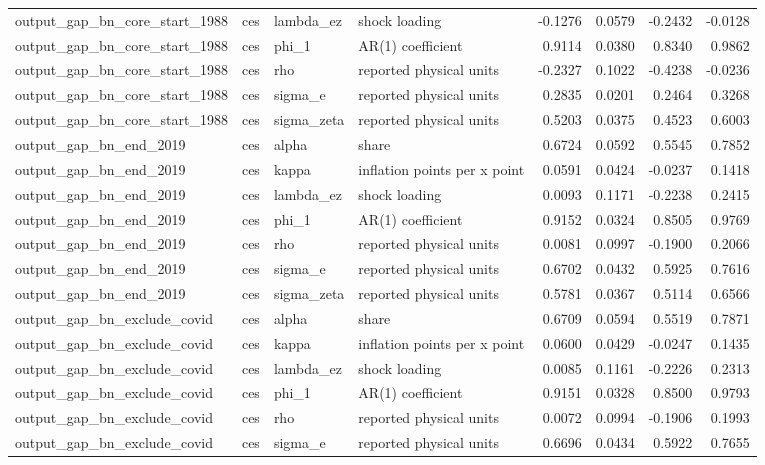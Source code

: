 \begin{tabular}{llllrrrr}
output\_gap\_bn\_core\_start\_1988 & ces & lambda\_ez & shock loading & -0.1276 & 0.0579 & -0.2432 & -0.0128 \\
output\_gap\_bn\_core\_start\_1988 & ces & phi\_1 & AR(1) coefficient & 0.9114 & 0.0380 & 0.8340 & 0.9862 \\
output\_gap\_bn\_core\_start\_1988 & ces & rho & reported physical units & -0.2327 & 0.1022 & -0.4238 & -0.0236 \\
output\_gap\_bn\_core\_start\_1988 & ces & sigma\_e & reported physical units & 0.2835 & 0.0201 & 0.2464 & 0.3268 \\
output\_gap\_bn\_core\_start\_1988 & ces & sigma\_zeta & reported physical units & 0.5203 & 0.0375 & 0.4523 & 0.6003 \\
output\_gap\_bn\_end\_2019 & ces & alpha & share & 0.6724 & 0.0592 & 0.5545 & 0.7852 \\
output\_gap\_bn\_end\_2019 & ces & kappa & inflation points per x point & 0.0591 & 0.0424 & -0.0237 & 0.1418 \\
output\_gap\_bn\_end\_2019 & ces & lambda\_ez & shock loading & 0.0093 & 0.1171 & -0.2238 & 0.2415 \\
output\_gap\_bn\_end\_2019 & ces & phi\_1 & AR(1) coefficient & 0.9152 & 0.0324 & 0.8505 & 0.9769 \\
output\_gap\_bn\_end\_2019 & ces & rho & reported physical units & 0.0081 & 0.0997 & -0.1900 & 0.2066 \\
output\_gap\_bn\_end\_2019 & ces & sigma\_e & reported physical units & 0.6702 & 0.0432 & 0.5925 & 0.7616 \\
output\_gap\_bn\_end\_2019 & ces & sigma\_zeta & reported physical units & 0.5781 & 0.0367 & 0.5114 & 0.6566 \\
output\_gap\_bn\_exclude\_covid & ces & alpha & share & 0.6709 & 0.0594 & 0.5519 & 0.7871 \\
output\_gap\_bn\_exclude\_covid & ces & kappa & inflation points per x point & 0.0600 & 0.0429 & -0.0247 & 0.1435 \\
output\_gap\_bn\_exclude\_covid & ces & lambda\_ez & shock loading & 0.0085 & 0.1161 & -0.2226 & 0.2313 \\
output\_gap\_bn\_exclude\_covid & ces & phi\_1 & AR(1) coefficient & 0.9151 & 0.0328 & 0.8500 & 0.9793 \\
output\_gap\_bn\_exclude\_covid & ces & rho & reported physical units & 0.0072 & 0.0994 & -0.1906 & 0.1993 \\
output\_gap\_bn\_exclude\_covid & ces & sigma\_e & reported physical units & 0.6696 & 0.0434 & 0.5922 & 0.7655 \\

\end{tabular}
